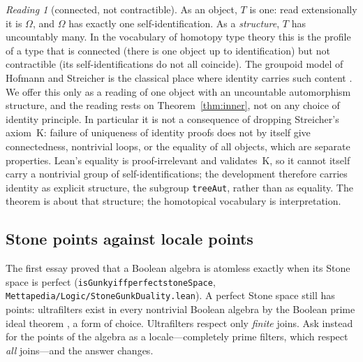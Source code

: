 \documentclass[]{article}
\theoremstyle{definition}
\theoremstyle{remark}
\newtheorem{reading}[theorem]{Reading}
\newcommand{\codeus}{\textunderscore\allowbreak}
\newcommand{\code}[1]{\texttt{\let\_\codeus #1}}
\newcommand{\lpath}[1]{{\ttfamily\nolinkurl{#1}}}
\newcommand{\Om}{\Omega}
\begin{document}
\begin{reading}[connected, not contractible]
\label{read:connected}
As an object, $T$ is one: read extensionally it is $\Om$, and $\Om$ has exactly one
self-identification. As a \emph{structure}, $T$ has uncountably many. In the vocabulary of homotopy
type theory \cite{HoTTBook} this is the profile of a type that is connected (there is one object
up to identification) but not contractible (its self-identifications do not all coincide). The
groupoid model of Hofmann and Streicher is the classical place where identity carries such content
\cite{HofmannStreicher1998}. We offer this only as a reading of one object with an uncountable
automorphism structure, and the reading rests on Theorem~\ref{thm:inner}, not on any choice of
identity principle. In particular it is not a consequence of dropping Streicher's axiom~K: failure of
uniqueness of identity proofs does not by itself give connectedness, nontrivial loops, or the
equality of all objects, which are separate properties. Lean's equality is proof-irrelevant and
validates~K, so it cannot itself carry a nontrivial group of self-identifications; the development
therefore carries identity as explicit structure, the subgroup \code{treeAut}, rather than as
equality. The theorem is about that structure; the homotopical vocabulary is interpretation.
\end{reading}

\subsection{Stone points against locale points}
\label{sec:pointless}

The first essay proved that a Boolean algebra is atomless exactly when its Stone space is perfect
(\code{isGunky\_iff\_perfect\_stoneSpace}, \lpath{Mettapedia/Logic/StoneGunkDuality.lean}). A perfect Stone
space still has points: ultrafilters exist in every nontrivial Boolean algebra by the Boolean prime
ideal theorem \cite{Stone1936, Johnstone1982}, a form of choice. Ultrafilters respect only
\emph{finite} joins. Ask instead for the points of the algebra as a locale---completely prime filters,
which respect \emph{all} joins---and the answer changes.
\end{document}
